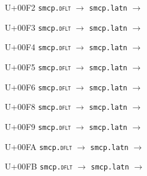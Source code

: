 \documentclass{article}
\begin{document}
\begin{substitutions}
\goodbreak

U+00F2  \linebreak
    \texttt{smcp.\textsc{dflt}} $\to$  \linebreak
    \texttt{smcp.latn} $\to$  

\goodbreak

U+00F3  \linebreak
    \texttt{smcp.\textsc{dflt}} $\to$  \linebreak
    \texttt{smcp.latn} $\to$  

\goodbreak

U+00F4  \linebreak
    \texttt{smcp.\textsc{dflt}} $\to$  \linebreak
    \texttt{smcp.latn} $\to$  

\goodbreak

U+00F5  \linebreak
    \texttt{smcp.\textsc{dflt}} $\to$  \linebreak
    \texttt{smcp.latn} $\to$  

\goodbreak

U+00F6  \linebreak
    \texttt{smcp.\textsc{dflt}} $\to$  \linebreak
    \texttt{smcp.latn} $\to$  

\goodbreak

U+00F8  \linebreak
    \texttt{smcp.\textsc{dflt}} $\to$  \linebreak
    \texttt{smcp.latn} $\to$  

\goodbreak

U+00F9  \linebreak
    \texttt{smcp.\textsc{dflt}} $\to$  \linebreak
    \texttt{smcp.latn} $\to$  

\goodbreak

U+00FA  \linebreak
    \texttt{smcp.\textsc{dflt}} $\to$  \linebreak
    \texttt{smcp.latn} $\to$  

\goodbreak

U+00FB  \linebreak
    \texttt{smcp.\textsc{dflt}} $\to$  \linebreak
    \texttt{smcp.latn} $\to$  


\end{substitutions}
\end{document}
